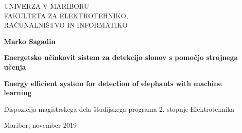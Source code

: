 \begin{titlepage}
    \begin{center}
 
        \fontsize{16}{26}
        \selectfont
        UNIVERZA V MARIBORU\\
        FAKULTETA ZA ELEKTROTEHNIKO,\\
        RAČUNALNIŠTVO IN INFORMATIKO
        \vspace*{4.0cm}

        \textbf{Marko Sagadin}

        \vspace{0.5cm}

        \fontsize{26}{26}
        \selectfont
        \textbf{Energetsko učinkovit sistem za detekcijo slonov s pomočjo strojnega učenja}
 
        \vspace{1.0cm}

        \fontsize{26}{26}
        \selectfont
        \textbf{Energy efficient system for detection of elephants with machine learning}

        \vspace{1.0cm}

        \fontsize{16}{18}
        \selectfont
        Dispozicija magistrskega dela študijskega programa 2. stopnje Elektrotehnika
 
        \vspace{6cm}
        Maribor, november 2019 
 
 
    \end{center}
\end{titlepage}
